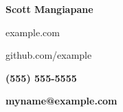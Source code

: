 \documentclass[12pt]{article}
\newcommand{\Chapter}[1]{
    \begingroup
    \color{black}\Huge\bfseries\centering
    #1
    \par
    \vspace{1mm plus .25mm minus .25mm}
    \endgroup
}
\newcommand{\InlineBold}[1]{
    \begingroup
    \color{black}\bfseries
    #1
    \endgroup
}
\begin{document}
\color{gray}
\pagestyle{empty}
\raggedright
\setlength{\columnsep}{32pt}
\setlength{\multicolsep}{0pt}

\Chapter{Scott Mangiapane}
\begin{center}
    \begin{multicols}{2}
        \begin{flushright}
            example.com\par
            github.com/example\par
        \end{flushright}
        \begin{flushleft}
            \InlineBold{(555) 555-5555}\par
            \InlineBold{myname@example.com}\par
        \end{flushleft}
    \end{multicols}
\end{center}
\end{document}
